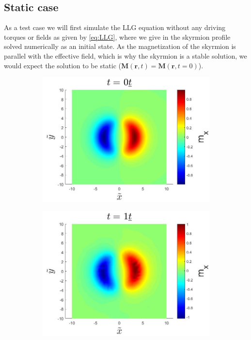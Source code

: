 \subsection{Static case}
As a test case we will first simulate the LLG equation without any driving torques or fields as given by \eqref{eq:LLG}, where we give in the skyrmion profile solved numerically as an initial state. As the magnetization of the skyrmion is parallel with the effective field, which is why the skyrmion is a stable solution, we would expect the solution to be static ($\mathbold{M}(\mathbold{r},t) = \mathbold{M}(\mathbold{r},t=0)$).
\begin{figure}[h!]
\centering
\begin{subfigure}{.3\textwidth}
  \centering
  \includegraphics[width=\linewidth]{Figures/StaticSkyrmionMxT0.jpg}
  \caption{}
  \label{fig:StaticSkyrmionMxT0}
\end{subfigure}
\begin{subfigure}{.3\textwidth}
  \centering
  \includegraphics[width=\linewidth]{Figures/StaticSkyrmionMxT1.jpg}

\end{subfigure}
\end{figure}
